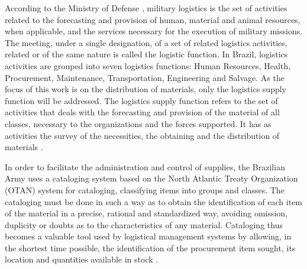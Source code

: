 According to the Ministry of Defense \cite{brasil2003}, military logistics is the set of activities related to the forecasting and provision of human, material and animal resources, when applicable, and the services necessary for the execution of military missions. The meeting, under a single designation, of a set of related logistics activities, related or of the same nature is called the logistic function. In Brazil, logistics activities are grouped into seven logistics functions: Human Resources, Health, Procurement, Maintenance, Transportation, Engineering and Salvage. As the focus of this work is on the distribution of materials, only the logistics supply function will be addressed. The logistics supply function refers to the set of activities that deals with the forecasting and provision of the material of all classes, necessary to the organizations and the forces supported. It has as activities the survey of the necessities, the obtaining and the distribution of materials \cite{brasil2003}.


In order to facilitate the administration and control of supplies, the Brazilian Army uses a cataloging system based on the North Atlantic Treaty Organization (OTAN) \cite{otan2012} system for cataloging, classifying items into groups and classes. The cataloging must be done in such a way as to obtain the identification of each item of the material in a precise, rational and standardized way, avoiding omission, duplicity or doubts as to the characteristics of any material. Cataloging thus becomes a valuable tool used by logistical management systems by allowing, in the shortest time possible, the identification of the procurement item sought, its location and quantities available in stock \cite{brasil2003}.

